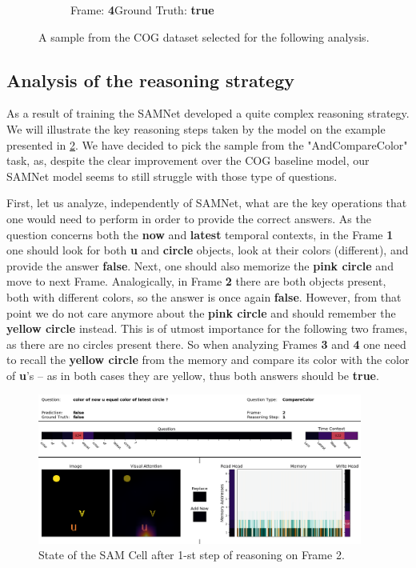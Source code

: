 \begin{figure}[htbp]
\begin{subfigure}{0.25\textwidth}
	\caption{Frame: \textbf{4}\newline Ground Truth: \textbf{true}}
	\label{fig:frame-4}
  \end{subfigure}%
  \hfill\null
  \newline
  \centering
\caption{A sample from the COG dataset selected for the following analysis.} 
\label{fig:example}  
\end{figure}

\subsection{Analysis of the reasoning strategy}
As a result of training the SAMNet developed a quite complex reasoning strategy.
We will illustrate the key reasoning steps taken by the model on the example presented in \cref{fig:example}.
We have decided to pick the sample from the "AndCompareColor" task, as, despite the clear improvement over the COG baseline model, our SAMNet model seems to still struggle with those type of questions.	

First, let us analyze, independently of SAMNet, what are the key operations that one would need to perform in order to provide the correct answers. 
As the question concerns both the \textbf{now} and \textbf{latest} temporal contexts, in the Frame \textbf{1} one should look for both \textbf{u} and \textbf{circle} objects, look at their colors (different), and provide the answer \textbf{false}.
Next, one should also memorize the \textbf{pink circle} and move to next Frame.
Analogically, in Frame \textbf{2} there are both objects present, both with different colors, so the answer is once again \textbf{false}.
However, from that point we do not care anymore about the \textbf{pink circle} and should remember the \textbf{yellow circle} instead.
This is of utmost importance for the following two frames, as there are no circles present there.
So when analyzing Frames \textbf{3} and \textbf{4} one need to recall the \textbf{yellow circle} from the memory and compare its color with the color of \textbf{u}'s -- as in both cases they are yellow, thus  both answers should be \textbf{true}.

\begin{figure}[!h]
	\centering
	\includegraphics[width=0.95\textwidth]{"../img/visualization/sample 2/Frame 2 Step 1"}
	\caption{State of the SAM Cell after 1-st step of reasoning on Frame 2.} 
	\label{fig:frame-2-step-1}
\end{figure}


